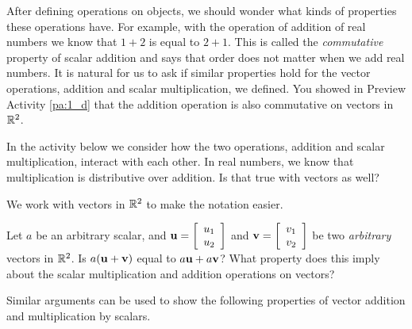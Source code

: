 After defining operations on objects, we should wonder what kinds of properties these operations have. For example, with the operation of addition of real numbers we know that $1+2$ is equal to $2+1$. This is called the \emph{commutative} property of scalar addition and says that order does not matter when we add real numbers. It is natural for us to ask if similar properties hold for the vector operations, addition and scalar multiplication, we defined. You showed in Preview Activity \ref{pa:1_d} that the addition operation is also commutative on vectors in $\mathbb{R}^2$. 



In the activity below we consider how the two operations, addition and scalar multiplication, interact with each other. In real numbers, we know that multiplication is distributive over addition. Is that true with vectors as well?



\begin{activity} \label{act:A1.3_1} We work with vectors in $\mathbb{R}^2$ to make the notation easier. 
	
Let $a$ be an arbitrary scalar, and $\mathbf{u} = \left[ \begin{array}{c} u_1\\ u_2\end{array} \right]$ and $\mathbf{v} = \left[ \begin{array}{c} v_1\\ v_2\end{array} \right]$ be two \emph{arbitrary} vectors in $\mathbb{R}^2$. Is $a(\mathbf{u} + \mathbf{v})$ equal to $a\mathbf{u} + a\mathbf{v}$? What property does this imply about the scalar multiplication and addition operations on vectors?


\end{activity}


Similar arguments can be used to show the following properties of vector addition and multiplication by scalars.


